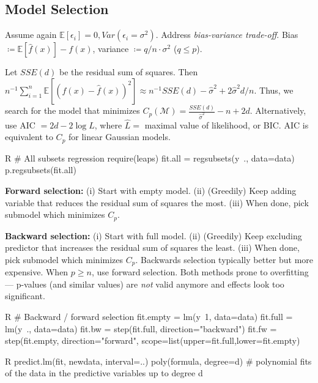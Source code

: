 \subsection{Model Selection}\label{subsec:model_selection}
\begin{sectionbox}\nospacing{}
  Assume again $\mathbb{E}[\epsilon_{i}] = 0, Var(\epsilon_{i} = \sigma^{2})$.
  Address \emph{bias-variance trade-off}.
  Bias $\coloneq\mathbb{E} [\hat f(x)] - f(x)$, variance $\coloneq q/n \cdot \sigma^{2}$ ($q \leq p$).
\end{sectionbox}
\begin{sectionbox}\nospacing{}
  Let $SSE(d)$ be the residual sum of squares.
  Then $n^{-1} \sum_{i=1}^{n} \mathbb{E}\left[{(f(x) - \hat f(x))}^{2}\right] \approx n^{-1}SSE(d)-\hat \sigma^{2} + 2\hat\sigma^{2}d/n$.
  Thus, we search for the model that minimizes $C_{p}(\mathcal{M}) = \frac{SSE(d)}{\hat \sigma^{2}} - n + 2d$.
  Alternatively, use AIC $=2d-2\log \hat{L}$, where $\hat{L}=$ maximal value of likelihood, or BIC. AIC is equivalent to $C_{p}$ for linear Gaussian models.
  \begin{mintlinebox}{R}
    # All subsets regression
    require(leaps)
    fit.all = regsubsets(y~., data=data)
    p.regsubsets(fit.all)
  \end{mintlinebox}
\end{sectionbox}
\begin{sectionbox}\nospacing{}
  \textbf{Forward selection:} (i) Start with empty model. (ii) (Greedily) Keep adding variable that reduces the residual sum of squares the most. (iii) When done, pick submodel which minimizes $C_{p}$.

  \textbf{Backward selection:} (i) Start with full model. (ii) (Greedily) Keep excluding predictor that increases the residual sum of squares the least. (iii) When done, pick submodel which minimizes $C_{p}$.
  Backwards selection typically better but more expensive. When $p \geq n$, use forward selection.
  Both methods prone to overfitting --- p-values (and similar values) are \emph{not} valid anymore and effects look too significant.
  \begin{mintlinebox}{R}
    # Backward / forward selection
    fit.empty = lm(y~1, data=data)
    fit.full = lm(y~., data=data)
    fit.bw = step(fit.full, direction="backward")
    fit.fw = step(fit.empty, direction="forward", scope=list(upper=fit.full,lower=fit.empty)
  \end{mintlinebox}

\end{sectionbox}
\begin{mintlinebox}{R}
 predict.lm(fit, newdata, interval=..)
 poly(formula, degree=d) # polynomial fits of the data in the predictive variables
up to degree d
\end{mintlinebox}